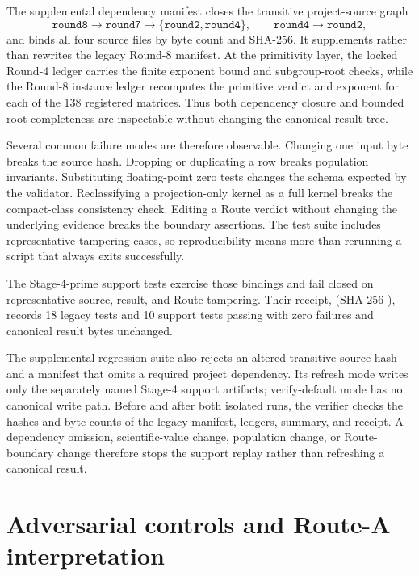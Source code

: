 \documentclass[11pt]{article}
\theoremstyle{definition}
\theoremstyle{remark}
\begin{document}
The supplemental dependency manifest closes the transitive project-source graph
\[
\texttt{round8}\longrightarrow\texttt{round7}
\longrightarrow\{\texttt{round2},\texttt{round4}\},
\qquad
\texttt{round4}\longrightarrow\texttt{round2},
\]
and binds all four source files by byte count and SHA-256. It supplements rather than rewrites the legacy Round-8 manifest. At the primitivity layer, the locked Round-4 ledger carries the finite exponent bound and subgroup-root checks, while the Round-8 instance ledger recomputes the primitive verdict and exponent for each of the 138 registered matrices. Thus both dependency closure and bounded root completeness are inspectable without changing the canonical result tree.

Several common failure modes are therefore observable. Changing one input byte breaks the source hash. Dropping or duplicating a row breaks population invariants. Substituting floating-point zero tests changes the schema expected by the validator. Reclassifying a projection-only kernel as a full kernel breaks the compact-class consistency check. Editing a Route verdict without changing the underlying evidence breaks the boundary assertions. The test suite includes representative tampering cases, so reproducibility means more than rerunning a script that always exits successfully.

The Stage-4-prime support tests exercise those bindings and fail closed on representative source, result, and Route tampering. Their receipt,  (SHA-256 ), records 18 legacy tests and 10 support tests passing with zero failures and canonical result bytes unchanged.

The supplemental regression suite also rejects an altered transitive-source hash and a manifest that omits a required project dependency. Its refresh mode writes only the separately named Stage-4 support artifacts; verify-default mode has no canonical write path. Before and after both isolated runs, the verifier checks the hashes and byte counts of the legacy manifest, ledgers, summary, and receipt. A dependency omission, scientific-value change, population change, or Route-boundary change therefore stops the support replay rather than refreshing a canonical result.

\section{Adversarial controls and Route-A interpretation}
\end{document}
